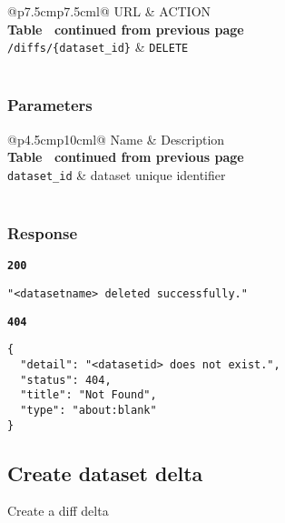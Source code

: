\begin{longtable}[c]{@{}p{7.5cm}p{7.5cm}l@{}}
  \toprule
  URL                             & ACTION                    \\* \midrule
  \endfirsthead
  \multicolumn{3}{c}%
  {{\bfseries Table \thetable\ continued from previous page}} \\
  \endhead
  \bottomrule
  \endfoot
  \endlastfoot
  \texttt{/diffs/\{dataset\_id\}} & \texttt{DELETE}           \\* \bottomrule
  \label{tab:rdf-differ-delete-diffs}                         \\
\end{longtable}

\subsubsection{Parameters}
\begin{longtable}[c]{@{}p{4.5cm}p{10cm}l@{}}
  \toprule
  Name                 & Description                          \\* \midrule
  \endfirsthead
  \multicolumn{3}{c}%
  {{\bfseries Table \thetable\ continued from previous page}} \\
  \endhead
  \bottomrule
  \endfoot
  \endlastfoot
  \texttt{dataset\_id} & dataset unique identifier                  \\* \bottomrule
  \label{tab:rdf-differ-get-diff-parameters}                  \\
\end{longtable}

\subsubsection{Response}
\textbf{\texttt{200}}
\begin{lstlisting}
"<datasetname> deleted successfully."
\end{lstlisting}

\textbf{\texttt{404}}
\begin{lstlisting}
{
  "detail": "<datasetid> does not exist.",
  "status": 404,
  "title": "Not Found",
  "type": "about:blank"
}
\end{lstlisting}

\subsection{Create dataset delta}
Create a diff delta

